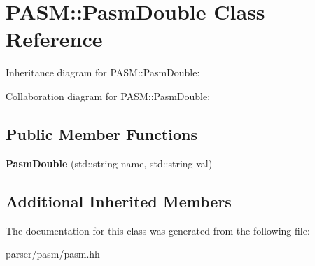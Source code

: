 \hypertarget{classPASM_1_1PasmDouble}{}\section{P\+A\+SM\+:\+:Pasm\+Double Class Reference}
\label{classPASM_1_1PasmDouble}


Inheritance diagram for P\+A\+SM\+:\+:Pasm\+Double\+:


Collaboration diagram for P\+A\+SM\+:\+:Pasm\+Double\+:
\subsection*{Public Member Functions}
\begin{DoxyCompactItemize}
\item 
\mbox{\label{classPASM_1_1PasmDouble_a05e471e7cb8cbe4339ec34bcc5dccbca}} 
{\bfseries Pasm\+Double} (std\+::string name, std\+::string val)
\end{DoxyCompactItemize}
\subsection*{Additional Inherited Members}


The documentation for this class was generated from the following file\+:\begin{DoxyCompactItemize}
\item 
parser/pasm/pasm.\+hh\end{DoxyCompactItemize}
